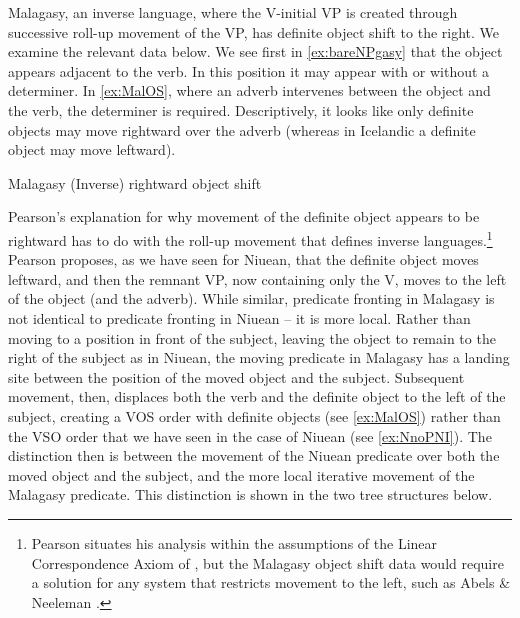\documentclass[output=paper,colorlinks,citecolor=brown,
]{langscibook}
\begin{document}
Malagasy, an inverse language, where the V-initial VP is created through successive roll-up movement of the VP, has definite object shift to the right.   We examine the relevant data below.  We see first in \ref{ex:bareNPgasy} that the object appears adjacent to the verb. In this position it may  appear with or without a determiner.  In \ref{ex:MalOS}, where an adverb intervenes between the object and the verb, the determiner is required.  Descriptively, it looks like only definite objects may move rightward over the adverb (whereas in Icelandic a definite object may move leftward). 

\ea Malagasy (Inverse) rightward object shift

 Pearson's explanation for why movement of the definite object appears to be rightward has to do with the roll-up movement that defines inverse languages.\footnote{Pearson situates his analysis within the assumptions of the Linear Correspondence Axiom of \cite{Kayne:1994}, but the Malagasy object shift data would require a solution for any system that restricts movement to the left, such as Abels \& Neeleman \citeyearpar{Abels:2012}.}  Pearson proposes, as we have seen for Niuean, that the definite object moves leftward, and then the remnant VP, now containing only the V, moves to the left of the object (and the adverb).  While similar, predicate fronting in Malagasy is not identical to  predicate fronting in Niuean -- it is more local.  Rather than moving to a position in front of the subject, leaving the object to remain to the right of the subject as in Niuean, the moving predicate in Malagasy has a landing site between the position of the moved object and the subject.  Subsequent movement, then, displaces both the verb and the definite object to the left of the subject, creating a VOS order with definite objects  (see \ref{ex:MalOS}) rather than the VSO order that we have seen in the case of Niuean (see \ref{ex:NnoPNI}).  The distinction then is between the movement of the Niuean predicate over both the moved object and the subject, and the more local iterative movement of the Malagasy predicate.  This distinction is shown in the two tree structures below.
\end{document}
